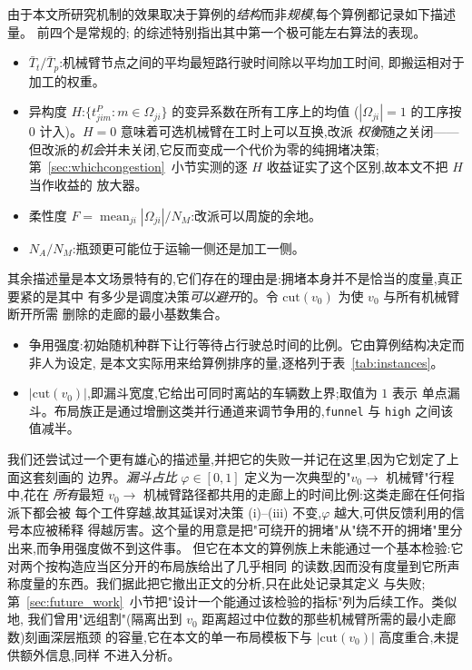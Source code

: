 \documentclass[manuscript,screen,review]{acmart}
\begin{document}
由于本文所研究机制的效果取决于算例的\emph{结构}而非\emph{规模},每个算例都记录如下描述量。
前四个是常规的;\cite{xin2025review} 的综述特别指出其中第一个极可能左右算法的表现。

\begin{itemize}[leftmargin=*,topsep=2pt,itemsep=1pt]
\item $\bar{T}_t/\bar{T}_p$:机械臂节点之间的平均最短路行驶时间除以平均加工时间,
即搬运相对于加工的权重。
\item 异构度 $H$:$\{t^P_{jim}: m\in\Omega_{ji}\}$ 的变异系数在所有工序上的均值
($|\Omega_{ji}|=1$ 的工序按 $0$ 计入)。$H=0$ 意味着可选机械臂在工时上可以互换,改派
\emph{权衡}随之关闭——但改派的\emph{机会}并未关闭,它反而变成一个代价为零的纯拥堵决策;
第~\ref{sec:whichcongestion}~小节实测的逐 $H$ 收益证实了这个区别,故本文不把 $H$ 当作收益的
放大器。
\item 柔性度 $F=\operatorname{mean}_{ji}|\Omega_{ji}|/N_M$:改派可以周旋的余地。
\item $N_A/N_M$:瓶颈更可能位于运输一侧还是加工一侧。
\end{itemize}

其余描述量是本文场景特有的,它们存在的理由是:拥堵本身并不是恰当的度量,真正要紧的是其中
有多少是调度决策\emph{可以避开}的。令 $\mathrm{cut}(v_0)$ 为使 $v_0$ 与所有机械臂断开所需
删除的走廊的最小基数集合。

\begin{itemize}[leftmargin=*,topsep=2pt,itemsep=1pt]
\item 争用强度:初始随机种群下让行等待占行驶总时间的比例。它由算例结构决定而非人为设定,
是本文实际用来给算例排序的量,逐格列于表~\ref{tab:instances}。
\item $|\mathrm{cut}(v_0)|$,即漏斗宽度,它给出可同时离站的车辆数上界;取值为 $1$ 表示
单点漏斗。布局族正是通过增删这类并行通道来调节争用的,\texttt{funnel} 与 \texttt{high}
之间该值减半。
\end{itemize}

我们还尝试过一个更有雄心的描述量,并把它的失败一并记在这里,因为它划定了上面这套刻画的
边界。\emph{漏斗占比} $\varphi\in[0,1]$ 定义为一次典型的"$v_0\to$ 机械臂"行程中,花在
\emph{所有}最短 $v_0\to$ 机械臂路径都共用的走廊上的时间比例:这类走廊在任何指派下都会被
每个工件穿越,故其延误对决策 (i)--(iii) 不变,$\varphi$ 越大,可供反馈利用的信号本应被稀释
得越厉害。这个量的用意是把"可绕开的拥堵"从"绕不开的拥堵"里分出来,而争用强度做不到这件事。
但它在本文的算例族上未能通过一个基本检验:它对两个按构造应当区分开的布局族给出了几乎相同
的读数,因而没有度量到它所声称度量的东西。我们据此把它撤出正文的分析,只在此处记录其定义
与失败;第~\ref{sec:future_work}~小节把"设计一个能通过该检验的指标"列为后续工作。类似地,
我们曾用"远组割"(隔离出到 $v_0$ 距离超过中位数的那些机械臂所需的最小走廊数)刻画深层瓶颈
的容量,它在本文的单一布局模板下与 $|\mathrm{cut}(v_0)|$ 高度重合,未提供额外信息,同样
不进入分析。
\end{document}
